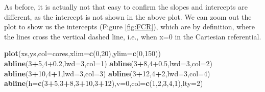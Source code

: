 \documentclass[
]{book}
\newenvironment{Shaded}{\begin{snugshade}}{\end{snugshade}}
\newcommand{\AttributeTok}[1]{\textcolor[rgb]{0.13,0.29,0.53}{#1}}
\newcommand{\DecValTok}[1]{\textcolor[rgb]{0.00,0.00,0.81}{#1}}
\newcommand{\FloatTok}[1]{\textcolor[rgb]{0.00,0.00,0.81}{#1}}
\newcommand{\FunctionTok}[1]{\textcolor[rgb]{0.13,0.29,0.53}{\textbf{#1}}}
\newcommand{\NormalTok}[1]{#1}
\newcommand{\SpecialCharTok}[1]{\textcolor[rgb]{0.81,0.36,0.00}{\textbf{#1}}}
\begin{document}
As before, it is actually not that easy to confirm the slopes and intercepts are different, as the intercept is not shown in the above plot. We can zoom out the plot to show us the intercepts (Figure \ref{fig:FCR}), which are by definition, where the lines cross the vertical dashed line, i.e., when x=0 in the Cartesian referential.

\begin{Shaded}
\begin{Highlighting}[]
\FunctionTok{plot}\NormalTok{(xs,ys,}\AttributeTok{col=}\NormalTok{cores,}\AttributeTok{xlim=}\FunctionTok{c}\NormalTok{(}\DecValTok{0}\NormalTok{,}\DecValTok{20}\NormalTok{),}\AttributeTok{ylim=}\FunctionTok{c}\NormalTok{(}\DecValTok{0}\NormalTok{,}\DecValTok{150}\NormalTok{))}
\FunctionTok{abline}\NormalTok{(}\DecValTok{3}\SpecialCharTok{+}\DecValTok{5}\NormalTok{,}\DecValTok{4}\FloatTok{+0.2}\NormalTok{,}\AttributeTok{lwd=}\DecValTok{3}\NormalTok{,}\AttributeTok{col=}\DecValTok{1}\NormalTok{)}
\FunctionTok{abline}\NormalTok{(}\DecValTok{3}\SpecialCharTok{+}\DecValTok{8}\NormalTok{,}\DecValTok{4}\FloatTok{+0.5}\NormalTok{,}\AttributeTok{lwd=}\DecValTok{3}\NormalTok{,}\AttributeTok{col=}\DecValTok{2}\NormalTok{)}
\FunctionTok{abline}\NormalTok{(}\DecValTok{3}\SpecialCharTok{+}\DecValTok{10}\NormalTok{,}\DecValTok{4}\SpecialCharTok{+}\DecValTok{1}\NormalTok{,}\AttributeTok{lwd=}\DecValTok{3}\NormalTok{,}\AttributeTok{col=}\DecValTok{3}\NormalTok{)}
\FunctionTok{abline}\NormalTok{(}\DecValTok{3}\SpecialCharTok{+}\DecValTok{12}\NormalTok{,}\DecValTok{4}\SpecialCharTok{+}\DecValTok{2}\NormalTok{,}\AttributeTok{lwd=}\DecValTok{3}\NormalTok{,}\AttributeTok{col=}\DecValTok{4}\NormalTok{)}
\FunctionTok{abline}\NormalTok{(}\AttributeTok{h=}\FunctionTok{c}\NormalTok{(}\DecValTok{3}\SpecialCharTok{+}\DecValTok{5}\NormalTok{,}\DecValTok{3}\SpecialCharTok{+}\DecValTok{8}\NormalTok{,}\DecValTok{3}\SpecialCharTok{+}\DecValTok{10}\NormalTok{,}\DecValTok{3}\SpecialCharTok{+}\DecValTok{12}\NormalTok{),}\AttributeTok{v=}\DecValTok{0}\NormalTok{,}\AttributeTok{col=}\FunctionTok{c}\NormalTok{(}\DecValTok{1}\NormalTok{,}\DecValTok{2}\NormalTok{,}\DecValTok{3}\NormalTok{,}\DecValTok{4}\NormalTok{,}\DecValTok{1}\NormalTok{),}\AttributeTok{lty=}\DecValTok{2}\NormalTok{)}
\end{Highlighting}
\end{Shaded}
\end{document}
